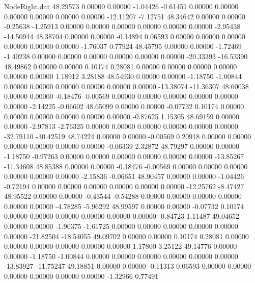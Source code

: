 \begin{filecontents}{NodeRight.dat}
  48.29573    0.00000    0.00000    -1.04426   -0.61451    0.00000    0.00000    0.00000    0.00000    0.00000    0.00000  -12.11207   -7.12751
  48.34642    0.00000    0.00000    -0.25638   -1.25913    0.00000    0.00000    0.00000    0.00000    0.00000    0.00000   -2.95438  -14.50944
  48.38704    0.00000    0.00000    -0.14894    0.06593    0.00000    0.00000    0.00000    0.00000    0.00000    0.00000   -1.76037    0.77924
  48.45795    0.00000    0.00000    -1.72469   -1.40238    0.00000    0.00000    0.00000    0.00000    0.00000    0.00000  -20.33393  -16.53390
  48.49862    0.00000    0.00000     0.10174    0.28081    0.00000    0.00000    0.00000    0.00000    0.00000    0.00000    1.18912    3.28188
  48.54930    0.00000    0.00000    -1.18750   -1.00844    0.00000    0.00000    0.00000    0.00000    0.00000    0.00000  -13.38074  -11.36307
  48.60038    0.00000    0.00000    -0.18476   -0.00569    0.00000    0.00000    0.00000    0.00000    0.00000    0.00000   -2.14225   -0.06602
  48.65099    0.00000    0.00000    -0.07732    0.10174    0.00000    0.00000    0.00000    0.00000    0.00000    0.00000   -0.87625    1.15305
  48.69159    0.00000    0.00000    -2.97813   -2.76325    0.00000    0.00000    0.00000    0.00000    0.00000    0.00000  -32.79110  -30.42519
  48.74224    0.00000    0.00000    -0.00569    0.20918    0.00000    0.00000    0.00000    0.00000    0.00000    0.00000   -0.06339    2.32872
  48.79297    0.00000    0.00000    -1.18750   -0.97263    0.00000    0.00000    0.00000    0.00000    0.00000    0.00000  -13.85267  -11.34608
  48.85388    0.00000    0.00000    -0.18476   -0.00569    0.00000    0.00000    0.00000    0.00000    0.00000    0.00000   -2.15836   -0.06651
  48.90457    0.00000    0.00000    -1.04426   -0.72194    0.00000    0.00000    0.00000    0.00000    0.00000    0.00000  -12.25762   -8.47427
  48.95522    0.00000    0.00000    -0.43544   -0.54288    0.00000    0.00000    0.00000    0.00000    0.00000    0.00000   -4.78285   -5.96292
  48.99597    0.00000    0.00000    -0.07732    0.10174    0.00000    0.00000    0.00000    0.00000    0.00000    0.00000   -0.84723    1.11487
  49.04652    0.00000    0.00000    -1.90375   -1.61725    0.00000    0.00000    0.00000    0.00000    0.00000    0.00000  -21.82504  -18.54055
  49.09702    0.00000    0.00000     0.10174    0.28081    0.00000    0.00000    0.00000    0.00000    0.00000    0.00000    1.17800    3.25122
  49.14776    0.00000    0.00000    -1.18750   -1.00844    0.00000    0.00000    0.00000    0.00000    0.00000    0.00000  -13.83927  -11.75247
  49.18851    0.00000    0.00000    -0.11313    0.06593    0.00000    0.00000    0.00000    0.00000    0.00000    0.00000   -1.32966    0.77491

\end{filecontents}
